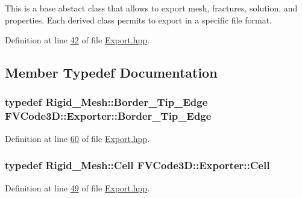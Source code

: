 This is a base abstact class that allows to export mesh, fractures, solution, and properties. Each derived class permits to export in a specific file format. 

Definition at line \hyperlink{Export_8hpp_source_l00042}{42} of file \hyperlink{Export_8hpp_source}{Export.\+hpp}.



\subsection{Member Typedef Documentation}
\subsubsection[{\texorpdfstring{Border\+\_\+\+Tip\+\_\+\+Edge}{Border_Tip_Edge}}]{\setlength{\rightskip}{0pt plus 5cm}typedef {\bf Rigid\+\_\+\+Mesh\+::\+Border\+\_\+\+Tip\+\_\+\+Edge} {\bf F\+V\+Code3\+D\+::\+Exporter\+::\+Border\+\_\+\+Tip\+\_\+\+Edge}}\hypertarget{classFVCode3D_1_1Exporter_a95d20e766a6bafa58cf9b4965d5dae09}{}\label{classFVCode3D_1_1Exporter_a95d20e766a6bafa58cf9b4965d5dae09}


Definition at line \hyperlink{Export_8hpp_source_l00060}{60} of file \hyperlink{Export_8hpp_source}{Export.\+hpp}.

\subsubsection[{\texorpdfstring{Cell}{Cell}}]{\setlength{\rightskip}{0pt plus 5cm}typedef {\bf Rigid\+\_\+\+Mesh\+::\+Cell} {\bf F\+V\+Code3\+D\+::\+Exporter\+::\+Cell}}\hypertarget{classFVCode3D_1_1Exporter_a47324b87e220f070d8474100d0d01b84}{}\label{classFVCode3D_1_1Exporter_a47324b87e220f070d8474100d0d01b84}


Definition at line \hyperlink{Export_8hpp_source_l00049}{49} of file \hyperlink{Export_8hpp_source}{Export.\+hpp}.

